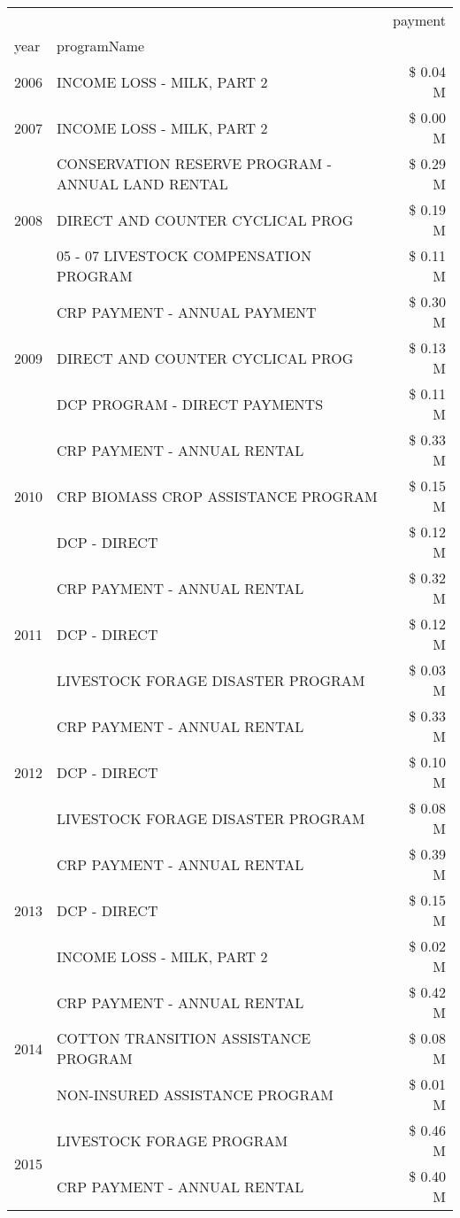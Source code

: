 \begin{tabular}{llr}
\toprule
 &  & payment \\
year & programName &  \\
\midrule
2006 & INCOME LOSS - MILK, PART 2 & \$ 0.04 M \\
\cline{1-3}
2007 & INCOME LOSS - MILK, PART 2 & \$ 0.00 M \\
\cline{1-3}
\multirow[t]{3}{*}{2008} & CONSERVATION RESERVE PROGRAM - ANNUAL LAND RENTAL & \$ 0.29 M \\
 & DIRECT AND COUNTER CYCLICAL PROG & \$ 0.19 M \\
 & 05 - 07 LIVESTOCK COMPENSATION PROGRAM & \$ 0.11 M \\
\cline{1-3}
\multirow[t]{3}{*}{2009} & CRP PAYMENT - ANNUAL PAYMENT & \$ 0.30 M \\
 & DIRECT AND COUNTER CYCLICAL PROG & \$ 0.13 M \\
 & DCP PROGRAM - DIRECT PAYMENTS & \$ 0.11 M \\
\cline{1-3}
\multirow[t]{3}{*}{2010} & CRP PAYMENT - ANNUAL RENTAL & \$ 0.33 M \\
 & CRP BIOMASS CROP ASSISTANCE PROGRAM & \$ 0.15 M \\
 & DCP - DIRECT & \$ 0.12 M \\
\cline{1-3}
\multirow[t]{3}{*}{2011} & CRP PAYMENT - ANNUAL RENTAL & \$ 0.32 M \\
 & DCP - DIRECT & \$ 0.12 M \\
 & LIVESTOCK FORAGE DISASTER PROGRAM & \$ 0.03 M \\
\cline{1-3}
\multirow[t]{3}{*}{2012} & CRP PAYMENT - ANNUAL RENTAL & \$ 0.33 M \\
 & DCP - DIRECT & \$ 0.10 M \\
 & LIVESTOCK FORAGE DISASTER PROGRAM & \$ 0.08 M \\
\cline{1-3}
\multirow[t]{3}{*}{2013} & CRP PAYMENT - ANNUAL RENTAL & \$ 0.39 M \\
 & DCP - DIRECT & \$ 0.15 M \\
 & INCOME LOSS - MILK, PART 2 & \$ 0.02 M \\
\cline{1-3}
\multirow[t]{3}{*}{2014} & CRP PAYMENT - ANNUAL RENTAL & \$ 0.42 M \\
 & COTTON TRANSITION ASSISTANCE PROGRAM & \$ 0.08 M \\
 & NON-INSURED ASSISTANCE PROGRAM & \$ 0.01 M \\
\cline{1-3}
\multirow[t]{3}{*}{2015} & LIVESTOCK FORAGE PROGRAM & \$ 0.46 M \\
 & CRP PAYMENT - ANNUAL RENTAL & \$ 0.40 M \\

\end{tabular}
